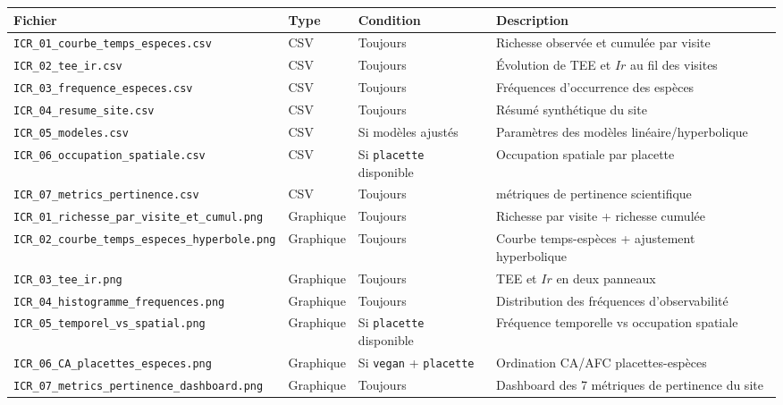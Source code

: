 {\def\LTcaptype{none} %
\begin{longtable}[]{@{}
  >{\raggedright\arraybackslash}p{}
  >{\raggedright\arraybackslash}p{}
  >{\raggedright\arraybackslash}p{}
  >{\raggedright\arraybackslash}p{}@{}}
\toprule\noalign{}
\begin{minipage}[b]{\linewidth}\raggedright
Fichier
\end{minipage} & \begin{minipage}[b]{\linewidth}\raggedright
Type
\end{minipage} & \begin{minipage}[b]{\linewidth}\raggedright
Condition
\end{minipage} & \begin{minipage}[b]{\linewidth}\raggedright
Description
\end{minipage} \\
\midrule\noalign{}
\endhead
\bottomrule\noalign{}
\endlastfoot
\texttt{ICR\_01\_courbe\_temps\_especes.csv} & CSV & Toujours & Richesse
observée et cumulée par visite \\
\texttt{ICR\_02\_tee\_ir.csv} & CSV & Toujours & Évolution de TEE et
\(Ir\) au fil des visites \\
\texttt{ICR\_03\_frequence\_especes.csv} & CSV & Toujours & Fréquences
d'occurrence des espèces \\
\texttt{ICR\_04\_resume\_site.csv} & CSV & Toujours & Résumé synthétique
du site \\
\texttt{ICR\_05\_modeles.csv} & CSV & Si modèles ajustés & Paramètres
des modèles linéaire/hyperbolique \\
\texttt{ICR\_06\_occupation\_spatiale.csv} & CSV & Si \texttt{placette}
disponible & Occupation spatiale par placette \\
\texttt{ICR\_07\_metrics\_pertinence.csv} & CSV & Toujours & 15
métriques de pertinence scientifique \\
\texttt{ICR\_01\_richesse\_par\_visite\_et\_cumul.png} & Graphique &
Toujours & Richesse par visite + richesse cumulée \\
\texttt{ICR\_02\_courbe\_temps\_especes\_hyperbole.png} & Graphique &
Toujours & Courbe temps-espèces + ajustement hyperbolique \\
\texttt{ICR\_03\_tee\_ir.png} & Graphique & Toujours & TEE et \(Ir\) en
deux panneaux \\
\texttt{ICR\_04\_histogramme\_frequences.png} & Graphique & Toujours &
Distribution des fréquences d'observabilité \\
\texttt{ICR\_05\_temporel\_vs\_spatial.png} & Graphique & Si
\texttt{placette} disponible & Fréquence temporelle vs occupation
spatiale \\
\texttt{ICR\_06\_CA\_placettes\_especes.png} & Graphique & Si
\texttt{vegan} + \texttt{placette} & Ordination CA/AFC
placettes-espèces \\
\texttt{ICR\_07\_metrics\_pertinence\_dashboard.png} & Graphique &
Toujours & Dashboard des 7 métriques de pertinence du site \\
\end{longtable}
}

